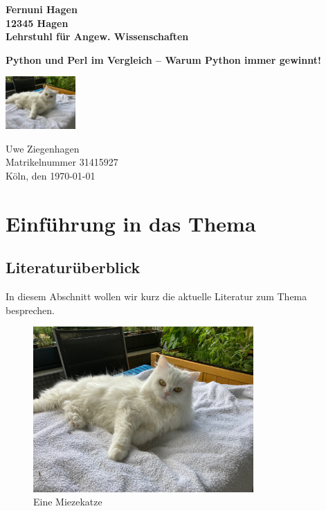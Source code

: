 \documentclass[a4paper, ngerman, 12pt,parskip=half]{scrreprt}
\begin{document}
\begin{titlepage}
{\large\textbf{Fernuni Hagen \\ 12345 Hagen \\ Lehrstuhl für Angew. Wissenschaften}}

\vspace*{4cm}

{\bfseries\huge Python und Perl im Vergleich -- Warum Python immer gewinnt! }

\begin{center}
	\includegraphics[width=0.2\textwidth]{Bilder/Katze1}
\end{center}

\vfill
Uwe Ziegenhagen \\
Matrikelnummer 31415927 \\
Köln, den \today 
\end{titlepage}

\tableofcontents
\listoffigures
\listoftables
	
\chapter{Einführung in das Thema}	
\section{Literaturüberblick}

In diesem Abschnitt wollen wir kurz die aktuelle Literatur zum Thema besprechen.	
	
\blindtext[10]

\begin{figure}
	\centering
	\includegraphics[width=0.75\textwidth]{Bilder/Katze1}
	\caption{Eine Miezekatze}\label{fig:katze1}
\end{figure}

\blindtext[10]
	
\end{document}
